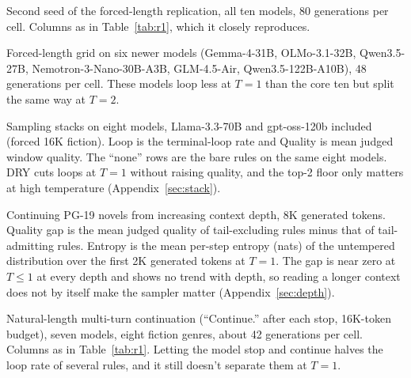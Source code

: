 \documentclass{article}
\begin{document}
\begin{table}[h]
\centering
\caption{Second seed of the forced-length replication, all ten models, 80 generations per cell. Columns as in Table~\ref{tab:r1}, which it closely reproduces.}
\label{tab:r9}
\small

\end{table}

\begin{table}[h]
\centering
\caption{Forced-length grid on six newer models (Gemma-4-31B, OLMo-3.1-32B, Qwen3.5-27B, Nemotron-3-Nano-30B-A3B, GLM-4.5-Air, Qwen3.5-122B-A10B), 48 generations per cell. These models loop less at $T{=}1$ than the core ten but split the same way at $T{=}2$.}
\label{tab:r10}
\small

\end{table}

\begin{table}[h]
\centering
\caption{Sampling stacks on eight models, Llama-3.3-70B and gpt-oss-120b included (forced 16K fiction). Loop is the terminal-loop rate and Quality is mean judged window quality. The ``none'' rows are the bare rules on the same eight models. DRY cuts loops at $T{=}1$ without raising quality, and the top-2 floor only matters at high temperature (Appendix~\ref{sec:stack}).}
\label{tab:stack}
\small

\end{table}

\begin{table}[h]
\centering
\caption{Continuing PG-19 novels from increasing context depth, 8K generated tokens. Quality gap is the mean judged quality of tail-excluding rules minus that of tail-admitting rules. Entropy is the mean per-step entropy (nats) of the untempered distribution over the first 2K generated tokens at $T{=}1$. The gap is near zero at $T{\le}1$ at every depth and shows no trend with depth, so reading a longer context does not by itself make the sampler matter (Appendix~\ref{sec:depth}).}
\label{tab:depth}
\small

\end{table}

\begin{table}[h]
\centering
\caption{Natural-length multi-turn continuation (``Continue.'' after each stop, 16K-token budget), seven models, eight fiction genres, about 42 generations per cell. Columns as in Table~\ref{tab:r1}. Letting the model stop and continue halves the loop rate of several rules, and it still doesn't separate them at $T{=}1$.}
\label{tab:r4}
\small

\end{table}
\end{document}

